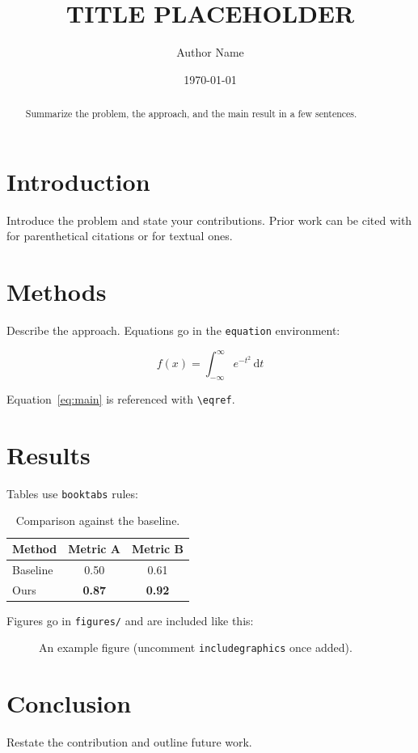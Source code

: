 \documentclass[11pt]{article}
\title{TITLE PLACEHOLDER}
\author{Author Name}
\date{\today}
\begin{document}
\maketitle

\begin{abstract}
Summarize the problem, the approach, and the main result in a few sentences.
\end{abstract}

\section{Introduction}\label{sec:intro}

Introduce the problem and state your contributions. Prior work can be cited
with \citep{sample2026} for parenthetical citations or \citet{sample2026} for
textual ones.

\section{Methods}\label{sec:methods}

Describe the approach. Equations go in the \texttt{equation} environment:

\begin{equation}\label{eq:main}
  f(x) = \int_{-\infty}^{\infty} e^{-t^2}\,\mathrm{d}t
\end{equation}

Equation~\eqref{eq:main} is referenced with \verb|\eqref|.

\section{Results}\label{sec:results}

Tables use \texttt{booktabs} rules:

\begin{table}[htbp]
  \centering
  \begin{tabular}{lcc}
    \toprule
    Method & Metric A & Metric B \\
    \midrule
    Baseline & 0.50 & 0.61 \\
    Ours     & \textbf{0.87} & \textbf{0.92} \\
    \bottomrule
  \end{tabular}
  \caption{Comparison against the baseline.}
  \label{tab:comparison}
\end{table}

Figures go in \texttt{figures/} and are included like this:

\begin{figure}[htbp]
  \centering
  \caption{An example figure (uncomment \texttt{includegraphics} once added).}
  \label{fig:example}
\end{figure}

\section{Conclusion}\label{sec:conclusion}

Restate the contribution and outline future work.



\end{document}
